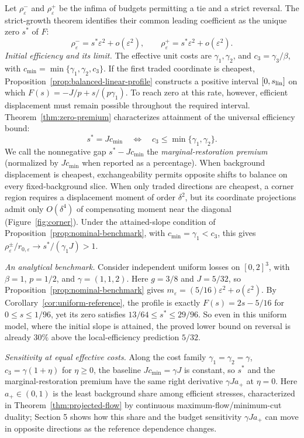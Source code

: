 Let \(\rho^-_\varepsilon\) and \(\rho^+_\varepsilon\) be the infima of budgets permitting a tie and a strict reversal. The strict-growth theorem identifies their common leading coefficient as the unique zero \(s^*\) of \(F\):
\[
\rho^-_\varepsilon=s^*\varepsilon^2+o(\varepsilon^2),\qquad
\rho^+_\varepsilon=s^*\varepsilon^2+o(\varepsilon^2).
\]
\emph{Initial efficiency and its limit.} The effective unit costs are \(\gamma_1,\gamma_2\), and \(c_3=\gamma_3/\beta\), with \(c_{\min}=\min\{\gamma_1,\gamma_2,c_3\}\). If the first traded coordinate is cheapest, Proposition~\ref{prop:balanced-linear-profile} constructs a positive interval \([0,s_{\rm lin}]\) on which \(F(s)=-J/p+s/(p\gamma_1)\). To reach zero at this rate, however, efficient displacement must remain possible throughout the required interval. Theorem~\ref{thm:zero-premium} characterizes attainment of the universal efficiency bound:
\[
s^*=Jc_{\min}\quad\Longleftrightarrow\quad
c_3\le\min\{\gamma_1,\gamma_2\}.
\]
We call the nonnegative gap \(s^*-Jc_{\min}\) the \emph{marginal-restoration premium} (normalized by \(Jc_{\min}\) when reported as a percentage). When background displacement is cheapest, exchangeability permits opposite shifts to balance on every fixed-background slice. When only traded directions are cheapest, a corner region requires a displacement moment of order \(\delta^2\), but its coordinate projections admit only \(O(\delta^4)\) of compensating moment near the diagonal (Figure~\ref{fig:corner}). Under the attained-slope condition of Proposition~\ref{prop:nominal-benchmark}, with \(c_{\min}=\gamma_1<c_3\), this gives \(\rho^\pm_\varepsilon/r_{0,\varepsilon}\to s^*/(\gamma_1J)>1\).

\emph{An analytical benchmark.} Consider independent uniform losses on \([0,2]^3\), with \(\beta=1\), \(p=1/2\), and \(\gamma=(1,1,2)\). Here \(g=3/8\) and \(J=5/32\), so Proposition~\ref{prop:nominal-benchmark} gives \(m_\varepsilon=(5/16)\varepsilon^2+o(\varepsilon^2)\). By Corollary~\ref{cor:uniform-reference}, the profile is exactly \(F(s)=2s-5/16\) for \(0\le s\le1/96\), yet its zero satisfies \(13/64\le s^*\le29/96\). So even in this uniform model, where the initial slope is attained, the proved lower bound on reversal is already \(30\%\) above the local-efficiency prediction \(5/32\).

\emph{Sensitivity at equal effective costs.} Along the cost family \(\gamma_1=\gamma_2=\gamma\), \(c_3=\gamma(1+\eta)\) for \(\eta\ge0\), the baseline \(Jc_{\min}=\gamma J\) is constant, so \(s^*\) and the marginal-restoration premium have the same right derivative \(\gamma Ja_+\) at \(\eta=0\). Here \(a_+\in(0,1)\) is the least background share among efficient stresses, characterized in Theorem~\ref{thm:projected-flow} by continuous maximum-flow/minimum-cut duality; Section 5 shows how this share and the budget sensitivity \(\gamma Ja_+\) can move in opposite directions as the reference dependence changes.

